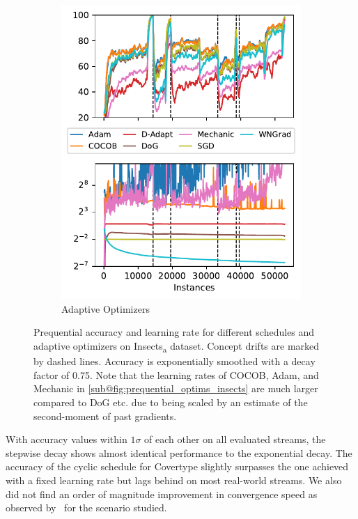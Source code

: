 \documentclass{article} %
\begin{document}
\begin{figure}[ht]
\begin{subfigure}[b]{0.99\textwidth - \asize}
      \includegraphics[width=\textwidth]{figures/lr_norms_optims_insects_abrupt.pdf}
      \caption{Adaptive Optimizers}
      \label{fig:prequential_optims_insects}
   \end{subfigure}
   \caption{Prequential accuracy and learning rate for different schedules and adaptive optimizers on Insects\textsubscript{a} dataset. Concept drifts are marked by dashed lines. Accuracy is exponentially smoothed with a decay factor of 0.75. Note that the learning rates of COCOB, Adam, and Mechanic in \ref{sub@fig:prequential_optims_insects} are much larger compared to DoG etc. due to being scaled by an estimate of the second-moment of past gradients.}
\end{figure}

With accuracy values within $1\sigma$ of each other on all evaluated streams, the stepwise decay shows almost identical performance to the exponential decay.
The accuracy of the cyclic schedule for Covertype slightly surpasses the one achieved with a fixed learning rate but lags behind on most real-world streams.
We also did not find an order of magnitude improvement in convergence speed as observed by~\citep{smithSuperConvergenceVeryFast2018a} for the scenario studied.
\end{document}
